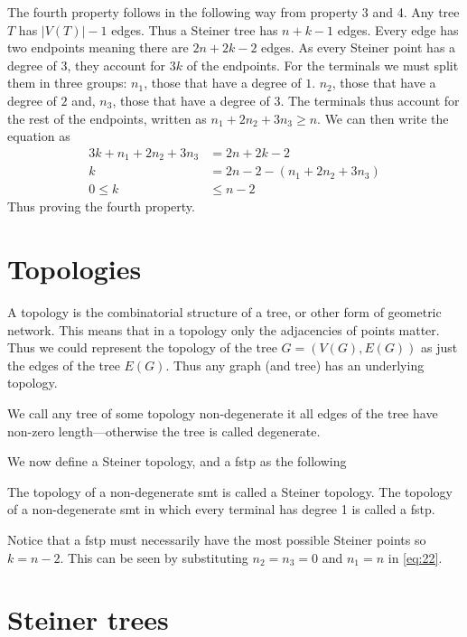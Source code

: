 The fourth property follows in the following way from property 3 and 4. Any
tree $T$ has $|V(T)|-1$ edges. Thus a Steiner tree has $n+k-1$ edges.
Every edge has two endpoints meaning there are $2 n + 2 k - 2$ edges. As every
Steiner point has a degree of $3$, they account for $3 k$ of the endpoints. For
the terminals we must split them in three groups: $n_1$, those that have a
degree of $1$. $n_2$, those that have a degree of $2$ and, $n_3$, those that
have a degree of $3$. The terminals thus account for the rest of the
endpoints, written as $n_1 + 2 n_2 + 3 n_3 \ge n$. We can then write the
equation as
%
\begin{align}
  \label{eq:22}
  3 k + n_1 + 2 n_2 + 3 n_3 &= 2 n + 2 k - 2 \\
  k &= 2 n - 2 - (n_1 + 2 n_2 + 3 n_3) \\
  0 \le k &\le n - 2
\end{align}
%
Thus proving the fourth property.

\section{Topologies}
\label{sec:topologies-1}

A topology is the combinatorial structure of a tree, or other form of geometric
network. This means that in a topology only the adjacencies of points
matter. Thus we could represent the topology of the tree $G = (V(G), E(G))$ as
just the edges of the tree $E(G)$. Thus any graph (and tree) has an
underlying topology.

We call any tree of some topology non-degenerate it all edges of the tree have
non-zero length---otherwise the tree is called degenerate.

We now define a Steiner topology, and a \ac{fstp} as the following
%
\begin{definition}
The topology of a non-degenerate \ac{smt} is called a Steiner topology. The
topology of a non-degenerate \ac{smt} in which every terminal has degree 1 is
called a \acl{fstp}.
\end{definition}
%
Notice that a \ac{fstp} must necessarily have the most possible Steiner points
so $ k = n - 2$. This can be seen by substituting $n_2 = n_3 = 0$ and $n_1 = n$
in \cref{eq:22}.

\section{Steiner trees}
\label{sec:steiner-trees}

